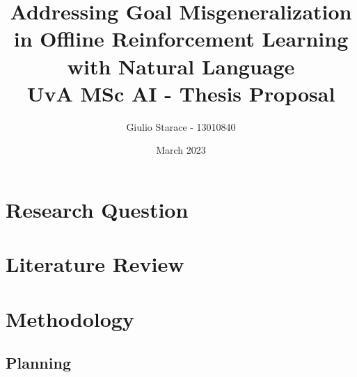\documentclass[12pt]{report}
\title{
Addressing Goal Misgeneralization in Offline Reinforcement Learning with Natural Language
\\
\Large UvA MSc AI - Thesis Proposal
}
\begin{document}
\author{Giulio Starace - 13010840}
\date{March 2023}
\maketitle
\chapter{Research Question}

\chapter{Literature Review}

\chapter{Methodology}

\section{Planning}



\end{document}
